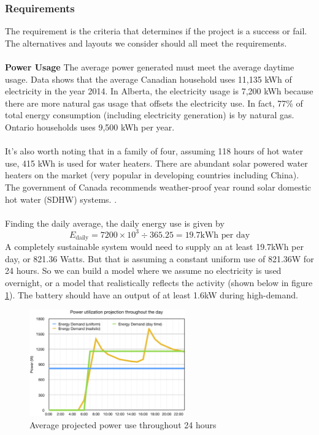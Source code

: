 \documentclass[10pt,letterpaper]{article}
\begin{document}
\subsubsection{Requirements}

The requirement is the criteria that determines if the project is a success or fail. The alternatives and layouts we consider should all meet the requirements.\\
\\
\textbf{Power Usage}
The average power generated must meet the average daytime usage. Data shows that the average Canadian household uses 11,135 kWh of electricity in the year 2014. In Alberta, the electricity usage is 7,200 kWh because there are more natural gas usage that offsets the electricity use. In fact, 77\% of total energy consumption (including electricity generation) is by natural gas. Ontario households uses 9,500 kWh per year.\cite{residential-energy-use}\\
\\
It's also worth noting that in a family of four, assuming 118 hours of hot water use, 415 kWh is used for water heaters. There are abundant solar powered water heaters on the market (very popular in developing countries including China). The government of Canada recommends weather-proof year round solar domestic hot water (SDHW) systems. \cite{residential-energy-use, gc-solar-water-heater}.\\
\\
Finding the daily average, the daily energy use is given by
$$
E_\text{daily}=7200\times10^3\div 365.25 = 19.7\text{kWh per day}
$$
A completely sustainable system would need to supply an at least 19.7kWh per day, or 821.36 Watts. But that is assuming a constant uniform use of 821.36W for 24 hours. So we can build a model where we assume no electricity is used overnight, or a model that realistically reflects the activity (shown below in figure \ref{fig:power-use-day}). The battery should have an output of at least 1.6kW during high-demand.
\\
\begin{figure}[H]
	\centering
	\includegraphics[width=0.6\textwidth]{assets/power-use-day}
	\caption{Average projected power use throughout 24 hours}
	\label{fig:power-use-day}
\end{figure}
\end{document}
